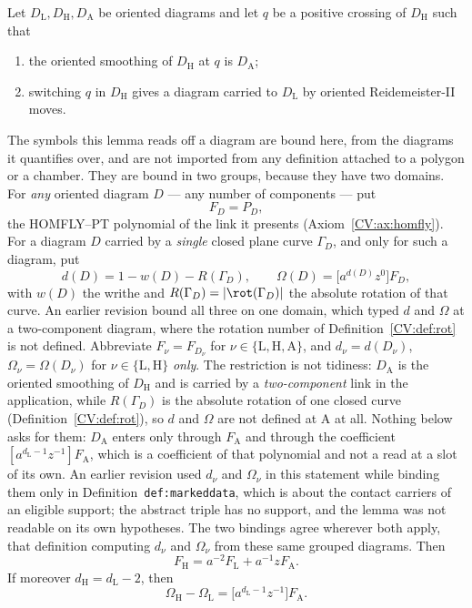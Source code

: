 \begin{lemma}\label{CV:lem:fulltwist}\leanok
Let $D_{\mathrm L},D_{\mathrm H},D_{\mathrm A}$ be oriented diagrams and let $q$
be a positive crossing of $D_{\mathrm H}$ such that
\begin{enumerate}
\item[(T1)] the oriented smoothing of $D_{\mathrm H}$ at $q$ is
$D_{\mathrm A}$;
\item[(T2)] switching $q$ in $D_{\mathrm H}$ gives a diagram carried to
$D_{\mathrm L}$ by oriented Reidemeister-II moves.
\end{enumerate}
The symbols this lemma reads off a diagram are bound here, from the diagrams it
quantifies over, and are not imported from any definition attached to a polygon
or a chamber. They are bound in two groups, because they have two domains. For
\emph{any} oriented diagram $D$ --- any number of components --- put
\[
   F_D=P_D ,
\]
the HOMFLY--PT polynomial of the link it presents (Axiom~\ref{CV:ax:homfly}). For
a diagram $D$ carried by a \emph{single} closed plane curve $\Gamma_D$, and
only for such a diagram, put
\[
   d(D)=1-w(D)-R(\Gamma_D),\qquad
   \Omega(D)=\bigl[a^{d(D)}z^0\bigr]F_D ,
\]
with $w(D)$ the writhe and $R(\Gamma_D)=|\rot(\Gamma_D)|$ the absolute
rotation of that curve. An earlier revision bound all three on one domain,
which typed $d$ and $\Omega$ at a two-component diagram, where the rotation
number of Definition~\ref{CV:def:rot} is not defined. Abbreviate $F_\nu=F_{D_\nu}$ for $\nu\in\{\mathrm L,\mathrm H,\mathrm A\}$,
and $d_\nu=d(D_\nu)$, $\Omega_\nu=\Omega(D_\nu)$ for
$\nu\in\{\mathrm L,\mathrm H\}$ \emph{only}. The restriction is not tidiness:
$D_{\mathrm A}$ is the oriented smoothing of $D_{\mathrm H}$ and is carried by a
\emph{two-component} link in the application, while $R(\Gamma_D)$ is the
absolute rotation of one closed curve (Definition~\ref{CV:def:rot}), so $d$ and
$\Omega$ are not defined at $\mathrm A$ at all. Nothing below asks for them:
$D_{\mathrm A}$ enters only through $F_{\mathrm A}$ and through the coefficient
$[a^{d_{\mathrm L}-1}z^{-1}]F_{\mathrm A}$, which is a coefficient of that
polynomial and not a read at a slot of its own. An
earlier revision used $d_\nu$ and $\Omega_\nu$ in this statement while binding
them only in Definition~\texttt{def:markeddata}, which is about the contact
carriers of an eligible support; the abstract triple has no support, and the
lemma was not readable on its own hypotheses. The two bindings agree wherever
both apply, that definition computing $d_\nu$ and $\Omega_\nu$ from these same
grouped diagrams. Then
\[
   F_{\mathrm H}=a^{-2}F_{\mathrm L}+a^{-1}zF_{\mathrm A}.
\]
If moreover $d_{\mathrm H}=d_{\mathrm L}-2$, then
\[
   \Omega_{\mathrm H}-\Omega_{\mathrm L}
   =\bigl[a^{d_{\mathrm L}-1}z^{-1}\bigr]F_{\mathrm A}.
\]
\end{lemma}
